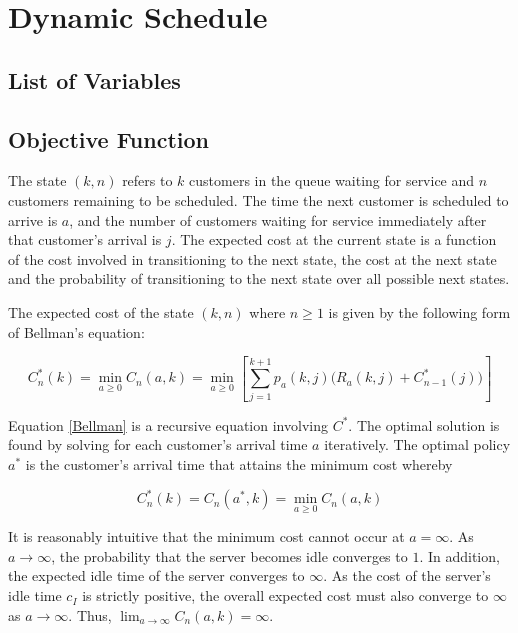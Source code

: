 \chapter{Dynamic Schedule}

\section{List of Variables}

\section{Objective Function}

The state $(k, n)$ refers to $k$ customers in the queue waiting for service and $n$ customers remaining to be scheduled. The time the next customer is scheduled to arrive is $a$, and the number of customers waiting for service immediately after that customer's arrival is $j$. The expected cost at the current state is a function of the cost involved in transitioning to the next state, the cost at the next state and the probability of transitioning to the next state over all possible next states. 

The expected cost of the state $(k, n)$ where $n \geq 1$ is given by the following form of Bellman's equation:

\begin{equation} \label{Bellman}
	C_{n}^{*} (k) = \min_{a \geq 0} C_{n} (a, k) = \min_{a \geq 0} \left[ \sum_{j = 1}^{k + 1} p_{a} (k, j) \Big( R_{a} (k, j) + C_{n - 1}^{*} (j) \Big) \right]
\end{equation}

Equation \ref{Bellman} is a recursive equation involving $C^{*}$. The optimal solution is found by solving for each customer's arrival time $a$ iteratively. The optimal policy $a^{*}$ is the customer's arrival time that attains the minimum cost whereby

\begin{equation} \label{Left-Closed}
	C_{n}^{*} (k) = C_{n} (a^{*}, k) = \min_{a \geq 0} C_{n} (a, k)
\end{equation}

It is reasonably intuitive that the minimum cost cannot occur at $a = \infty$. As $a \to \infty$, the probability that the server becomes idle converges to $1$. In addition, the expected idle time of the server converges to $\infty$. As the cost of the server's idle time $c_{I}$ is strictly positive, the overall expected cost must also converge to $\infty$ as $a \to \infty$. Thus, $\displaystyle \lim_{a \to \infty} C_{n} (a, k) = \infty$.

